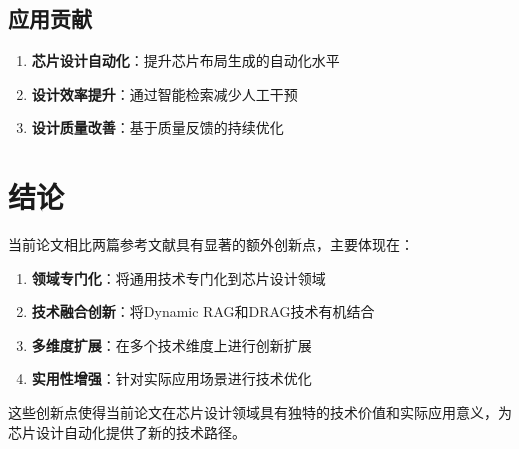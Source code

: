 \documentclass{ctexart}
\begin{document}
\subsection{应用贡献}
\begin{enumerate}
    \item \textbf{芯片设计自动化}：提升芯片布局生成的自动化水平
    \item \textbf{设计效率提升}：通过智能检索减少人工干预
    \item \textbf{设计质量改善}：基于质量反馈的持续优化
\end{enumerate}

\section{结论}

当前论文相比两篇参考文献具有显著的额外创新点，主要体现在：

\begin{enumerate}
    \item \textbf{领域专门化}：将通用技术专门化到芯片设计领域
    \item \textbf{技术融合创新}：将Dynamic RAG和DRAG技术有机结合
    \item \textbf{多维度扩展}：在多个技术维度上进行创新扩展
    \item \textbf{实用性增强}：针对实际应用场景进行技术优化
\end{enumerate}

这些创新点使得当前论文在芯片设计领域具有独特的技术价值和实际应用意义，为芯片设计自动化提供了新的技术路径。
\end{document}
